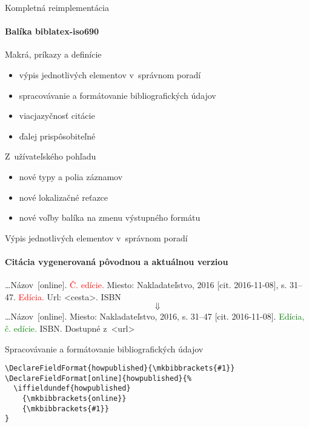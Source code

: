 \documentclass{beamer}
\begin{document}
\begin{frame}{Kompletná reimplementácia}
\framesubtitle{Balíka \textsf{biblatex-iso690}}
Makrá, príkazy a definície
\begin{itemize}
\item výpis jednotlivých elementov v~správnom poradí
\item spracovávanie a formátovanie bibliografických údajov
\item viacjazyčnosť citácie
\item ďalej prispôsobiteľné
\end{itemize}

Z~užívateľského pohľadu
\begin{itemize}
\item nové typy a polia záznamov
\item nové lokalizačné reťazce
\item nové voľby balíka na zmenu výstupného formátu
\end{itemize}
\end{frame}

\begin{frame}{Výpis jednotlivých elementov v~správnom poradí}
\framesubtitle{Citácia vygenerovaná pôvodnou a aktuálnou verziou}
\dots Názov~[online]. \textcolor{Red}{Č. edície.} Miesto: Nakladateľstvo, 2016 [cit. 2016-11-08], s. 31--47. \textcolor{Red}{Edícia.} Url: <cesta>. ISBN
\[
\Downarrow
\]
\dots Názov~[online]. Miesto: Nakladateľstvo, 2016, s. 31--47 [cit. 2016-11-08]. \textcolor{Green}{Edícia, č. edície.} ISBN. Dostupné z~<url>
\end{frame}

\begin{frame}[fragile]{Spracovávanie a formátovanie bibliografických údajov}
\begin{verbatim}
\DeclareFieldFormat{howpublished}{\mkbibbrackets{#1}}
\DeclareFieldFormat[online]{howpublished}{%
  \iffieldundef{howpublished}
    {\mkbibbrackets{online}}
    {\mkbibbrackets{#1}}
}
\end{verbatim}
\end{frame}
\end{document}
